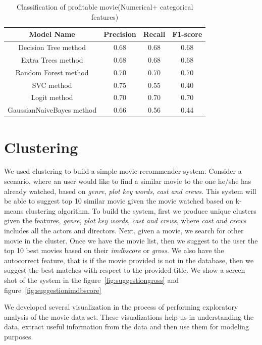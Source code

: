 \documentclass{article}%
\begin{document}
\begin{table}[tb]
\caption{Classification of profitable movie(Numerical+ categorical features)}
\label{tab:Classification_of_profit_movie_NC}
\begin{center}
\footnotesize
\begin{tabular}{|c|c|c|c|} \hline
\textbf{Model Name}& \textbf{Precision}& \textbf{Recall} & \textbf{F1-score }   \\ \hline \hline
Decision Tree method & 0.68	& 0.68 &	0.68\\ \hline
Extra Trees method & 0.68 &	0.68	&0.68\\ \hline
Random Forest method & 0.70	 & 0.70 &	0.70\\ \hline
SVC method & 0.75 &	0.55	&0.40\\ \hline
Logit method& 0.70	& 0.70	&0.70\\ \hline
GaussianNaiveBayes method &  0.66	& 0.56 &	0.44\\ \hline

\end{tabular}
\end{center}
\end{table}

\section{Clustering}

We used clustering to build a simple movie recommender system. Consider a scenario, where an user would like to find a similar movie to the one he/she has already watched, based on \textit{genre}, \textit{plot key words}, \textit{cast and crews}. This system will be able to suggest top 10 similar movie given the movie watched based on k-means clustering algorithm. 
To build the system, first we produce unique clusters given the features, \textit{genre}, \textit{plot key words}, \textit{cast and crews}, where \textit{cast and crews} includes all the actors and directors. Next, given a movie, we search for other movie in the cluster. Once we have the movie list, then we suggest to the user the top 10 best movies based on their \textit{imdbscore} or \textit{gross}. We also have the autocorrect feature, that is if the movie provided is not in the database, then we suggest the best matches with respect to the provided title. 
We show a screen shot of the system in the figure~\ref{fig:suggestiongross} and figure~\ref{fig:suggestionimdbscore} 

We developed several visualization in the process of performing exploratory analysis of the movie data set. These visualizations help us in understanding the data, extract useful information from the data and then use them for modeling purposes. 
\end{document}
